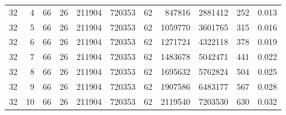 \begin{table}[t]
\begin{tabularx}{\linewidth}{rrrrrrrrrrr}
32 & 4 & 66 & 26 & 211904 & 720353 & 62 & 847816 & 2881412 & 252 & 0.013 \\
32 & 5 & 66 & 26 & 211904 & 720353 & 62 & 1059770 & 3601765 & 315 & 0.016 \\
32 & 6 & 66 & 26 & 211904 & 720353 & 62 & 1271724 & 4322118 & 378 & 0.019 \\
32 & 7 & 66 & 26 & 211904 & 720353 & 62 & 1483678 & 5042471 & 441 & 0.022 \\
32 & 8 & 66 & 26 & 211904 & 720353 & 62 & 1695632 & 5762824 & 504 & 0.025 \\
32 & 9 & 66 & 26 & 211904 & 720353 & 62 & 1907586 & 6483177 & 567 & 0.028 \\
32 & 10 & 66 & 26 & 211904 & 720353 & 62 & 2119540 & 7203530 & 630 & 0.032 \\
\bottomrule
\end{tabularx}
\end{table}
